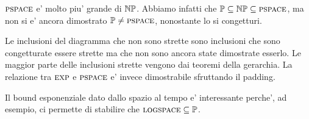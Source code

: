 $\textsc{pspace}$ e' molto piu' grande di $\mathbb{NP}$. Abbiamo infatti che $\mathbb{P} \subseteq \mathbb{NP}
\subseteq \textsc{pspace}$, ma non si e' ancora dimostrato $\mathbb{P} \not= \textsc{pspace}$, nonostante lo si
congetturi.

Le inclusioni del diagramma che non sono strette sono inclusioni che sono congetturate essere
strette ma che non sono ancora state dimostrate esserlo. Le maggior parte delle inclusioni strette
vengono dai teoremi della gerarchia. La relazione tra $\textsc{exp}$ e $\textsc{pspace}$ e' invece dimostrabile
sfruttando il padding.

Il bound esponenziale dato dallo spazio al tempo e' interessante perche', ad esempio, ci permette di
stabilire che $\textsc{logspace} \subseteq \mathbb{P}$.
